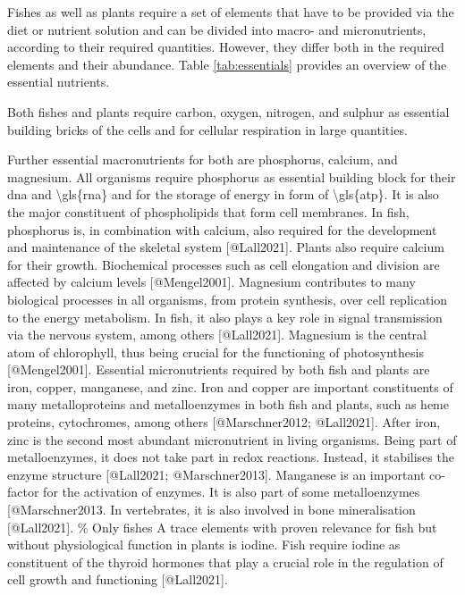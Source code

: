 Fishes as well as plants require a set of elements that have to be provided via the diet or nutrient solution and can be divided into macro- and micronutrients, according to their required quantities. However, they differ both in the required elements and their abundance. Table \ref{tab:essentials} provides an overview of the essential nutrients.

Both fishes and plants require carbon, oxygen, nitrogen, and sulphur as essential building bricks of the cells and for cellular respiration in large quantities. 

Further essential macronutrients for both are phosphorus, calcium, and magnesium. 
All organisms require phosphorus as essential building block for their \gls{dna and \gls{rna} and for the storage of energy in form of \gls{atp}. It is also the major constituent of phospholipids that form cell membranes. In fish, phosphorus is, in combination with calcium, also required for the development and maintenance of the skeletal system [@Lall2021]. Plants also require calcium for their growth. Biochemical processes such as cell elongation and division are affected by calcium levels [@Mengel2001].
Magnesium contributes to many biological processes in all organisms, from protein synthesis, over cell replication to the energy metabolism. In fish, it also plays a key role in signal transmission via the nervous system, among others [@Lall2021]. Magnesium is the central atom of chlorophyll, thus being crucial for the functioning of photosynthesis [@Mengel2001].

Essential micronutrients required by both fish and plants are iron, copper, manganese, and zinc. 
Iron and copper are important constituents of many metalloproteins and metalloenzymes in both fish and plants, such as heme proteins, cytochromes, among others [@Marschner2012; @Lall2021]. After iron, zinc is the second most abundant micronutrient in living organisms. Being part of metalloenzymes, it does not take part in redox reactions. Instead, it stabilises the enzyme structure [@Lall2021; @Marschner2013]. Manganese is an important co-factor for the activation of enzymes. It is also part of some metalloenzymes [@Marschner2013. In vertebrates, it is also involved in bone mineralisation [@Lall2021]. 

A trace elements with proven relevance for fish but without physiological function in plants is iodine. Fish require iodine as constituent of the thyroid hormones that play a crucial role in the regulation of cell growth and functioning [@Lall2021].

}
